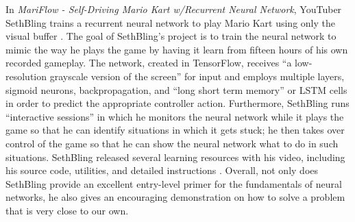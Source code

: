 In {\it MariFlow - Self-Driving Mario Kart w/Recurrent Neural Network}, YouTuber SethBling trains a recurrent neural network to play Mario Kart using only the visual buffer \cite{SethBling:2017}. The goal of SethBling's project is to train the neural network to mimic the way he plays the game by having it learn from fifteen hours of his own recorded gameplay. The network, created in TensorFlow, receives ``a low-resolution grayscale version of the screen'' for input and employs multiple layers, sigmoid neurons, backpropagation, and ``long short term memory'' or LSTM cells in order to predict the appropriate controller action. Furthermore, SethBling runs ``interactive sessions'' in which he monitors the neural network while it plays the game so that he can identify situations in which it gets stuck; he then takes over control of the game so that he can show the neural network what to do in such situations. SethBling released several learning resources with his video, including his source code, utilities, and detailed instructions \cite{SethBling:2017}. Overall, not only does SethBling provide an excellent entry-level primer for the fundamentals of neural networks, he also gives an encouraging demonstration on how to solve a problem that is very close to our own.

